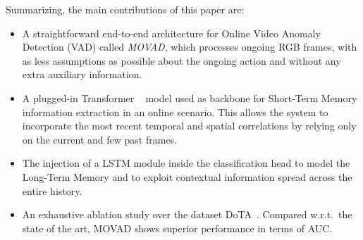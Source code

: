 Summarizing, the main contributions of this paper are:
\begin{itemize}%
    \item A straightforward end-to-end architecture for Online Video Anomaly Detection (VAD) called \emph{MOVAD}, which processes ongoing RGB frames, with as less assumptions as possible about the ongoing action and without any extra auxiliary information.
    \item A plugged-in Transformer ~\cite{liu_video_2022} model used as backbone for Short-Term Memory information extraction in an online scenario.
    This allows the system to incorporate the most recent temporal and spatial correlations by relying only on the current and few past frames.
    \item The injection of a LSTM module inside the classification head to model the Long-Term Memory and to exploit contextual information spread across the entire history.
    \item An exhaustive ablation study over the dataset DoTA~\cite{9712446}.
    Compared w.r.t.~the state of the art, MOVAD shows superior performance in terms of AUC.
\end{itemize}